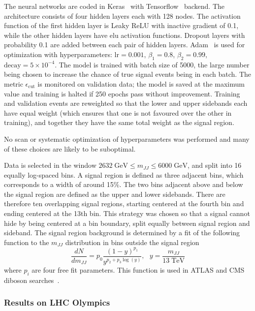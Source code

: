 \documentclass[a4paper,11pt]{article}
\begin{document}
\begin{enumerate}
    The neural networks are coded in Keras~\cite{keras} with Tensorflow~\cite{tensorflow} backend. The architecture consists of four hidden layers each with 128 nodes. The activation function of the first hidden layer is Leaky ReLU with inactive gradient of 0.1, while the other hidden layers have elu activation functions. Dropout layers with probability 0.1 are added between each pair of hidden layers. Adam~\cite{adam} is used for optimization with hyperparameters: $\text{lr} = 0.001$, $\beta_1 = 0.8$, $\beta_2 = 0.99$, $\text{decay} = 5\times10^{-4}$. The model is trained with batch size of 5000, the large number being chosen to increase the chance of true signal events being in each batch. The metric $\epsilon_\text{cut}$ is monitored on validation data; the model is saved at the maximum value and training is halted if 250 epochs pass without improvement. Training and validation events are reweighted so that the lower and upper sidebands each have equal weight (which ensures that one is not favoured over the other in training), and together they have the same total weight as the signal region.
\end{enumerate}

No scan or systematic optimization of hyperparameters was performed and many of these choices are likely to be suboptimal. 

Data is selected in the window $2632 \; \text{GeV} \leq m_{JJ} \leq 6000 \; \text{GeV}$, and split into 16 equally log-spaced bins. A signal region is defined as three adjacent bins, which corresponds to a width of around 15\%. The two bins adjacent above and below the signal region are defined as the upper and lower sidebands. There are therefore ten overlapping signal regions, starting centered at the fourth bin and ending centered at the 13th bin. This strategy was chosen so that a signal cannot hide by being centered at a bin boundary, split equally between signal region and sideband. The signal region background is determined by a fit of the following function to the $m_{JJ}$ distribution in bins outside the signal region
\begin{equation}
    \frac{dN}{d m_{JJ}} = p_0 \frac{(1-y)^{p_1}}{y^{p_2 + p_3 \log(y)}}, ~~~ y = \frac{m_{JJ}}{13 \; \text{TeV}}
\end{equation}
where $p_i$ are four free fit parameters. This function is used in ATLAS and CMS diboson searches~\cite{Aaboud:2017eta,Sirunyan:2016cao}.

\subsubsection{Results on LHC Olympics}
\label{sec:results}
\end{document}
